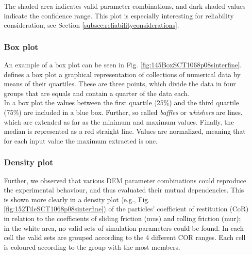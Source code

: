 The shaded area indicates valid parameter combinations, and dark shaded
values indicate the confidence range.
This plot is especially interesting for reliability consideration, see Section
\ref{subsec:reliabilityconsiderations}.




\subsubsection{Box plot}
\label{subsubsec:boxplot}
  
An example of a box plot can be seen
in Fig. \ref{fig:145BoxSCT1068p08sinterfine}.
\citet{RefWorks:207} defines a box plot a graphical representation of
collections of numerical data by means of their quartiles.
These are three points, which divide the data in four groups that are equals and
contain a quarter of the data each.\\
In a box plot the values between the first quartile (25\%) and the third
quartile (75\%) are included in a blue box.
Further, so called \textit{baffles} or \textit{whishers} are lines, which are
extended as far as the minimum and maximum values.
Finally, the median is represented as a red straight line.
Values are normalized, meaning that for each input value the maximum extracted
is one.



\subsubsection{Density plot}
\label{subsubsec:densityplot}

Further, we observed that various \acs{DEM} parameter
combinations could reproduce the experimental behaviour, and thus evaluated
their mutual dependencies.
This is shown more clearly in a density plot (e.g., Fig. 
\ref{fig:152TileSCT1068p08sinterfine}) 
of the particles' coefficient of restitution (\acs{CoR}) in relation to
the coefficients of sliding friction (\acs{mus}) and rolling friction (\acs{mur}); 
in the white area, no valid sets of simulation parameters could be found.
In each cell the valid sets are grouped according to the 4 different COR
ranges.
Each cell is coloured according to the group with the most members.





